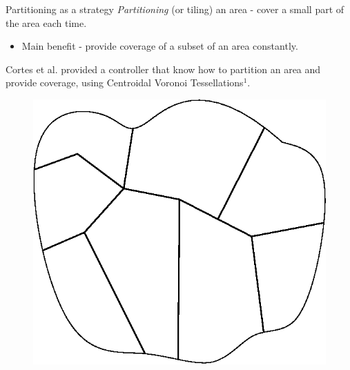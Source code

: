 \documentclass[t]{beamer}
\begin{document}
\begin{frame}[label=motivation12]{Partitioning as a strategy}
\emph{Partitioning} (or tiling) an area - cover a small part of the area each time.
\begin{itemize}
\item Main benefit - provide coverage of a subset of an area constantly.
\end{itemize}

Cortes et al. provided a controller that know how to partition an area and provide coverage, using Centroidal Voronoi Tessellations$^1$.

\begin{figure}[b]
\includegraphics[scale=0.4]{motivation/partitioning.eps}
\end{figure}

\end{frame}

\end{document}

